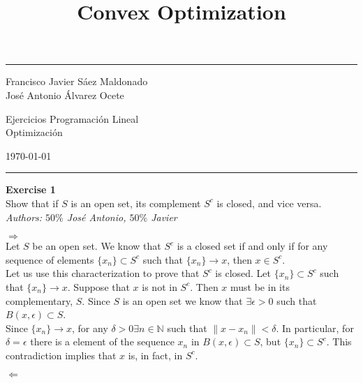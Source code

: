 \documentclass[11pt,table]{article}
\title{Convex Optimization}
\newenvironment{problem}[2][Exercise]
{ \begin{mdframed}[backgroundcolor=gray!20] \textbf{#1 #2} \\}
	{\hspace{0.0cm}\newline\newline \emph{Authors: \(50\%\) José Antonio, \(50\%\) Javier}  \end{mdframed}}
\begin{document}

\fancyhead[C]{}
\hrule \medskip %
\begin{minipage}{0.295\textwidth}
	\raggedright
	\footnotesize
	Francisco Javier Sáez Maldonado \hfill\\
	José Antonio Álvarez Ocete \hfill\\
\end{minipage}
\begin{minipage}{0.4\textwidth}
	\centering
	\large
	Ejercicios Programación Lineal\\
	\normalsize
	Optimización\\
\end{minipage}
\begin{minipage}{0.295\textwidth}
	\raggedleft
	\today\hfill\\
\end{minipage}
\medskip\hrule
\bigskip


\begin{problem}{1}
Show that if \( S \) is an open set, its complement \( S^c \) is closed, and vice versa.
\end{problem}

\(\boxed{\Rightarrow}\)\\

Let \(S\) be an open set. We know that \(S^c\) is a closed set if and only if for any sequence of elements \(\{x_n\} \subset S^c\) such that \(\{x_n\} \longrightarrow x\), then \(x \in S^c\). \\

Let us use this characterization to prove that \(S^c\) is closed. Let \(\{x_n\} \subset S^c\) such that \(\{x_n\} \longrightarrow x\). Suppose that \(x\) is not in \(S^c\). Then \(x\) must be in its complementary, \(S\). Since \(S\) is an open set we know that \(\exists \epsilon > 0\) such that \( B(x, \epsilon) \subset S\). \\

Since \(\{x_n\} \longrightarrow x\), for any \(\delta > 0 \exists n \in \mathbb{N}\) such that \( \parallel x - x_n \parallel < \delta\). In particular, for \(\delta = \epsilon\) there is a element of the sequence \(x_n\) in \( B(x, \epsilon) \subset S\), but \(\{x_n\} \subset S^c\). This contradiction implies that \(x\) is, in fact, in \(S^c\).

\(\boxed{\Leftarrow}\)\\
\end{document}
